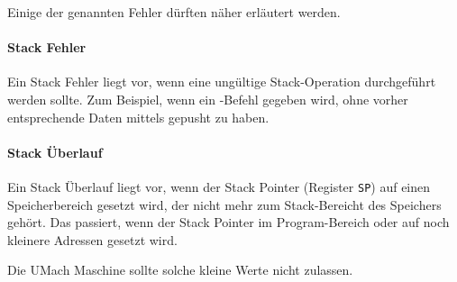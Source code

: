 Einige der genannten Fehler dürften näher erläutert werden.

\paragraph{Stack Fehler}
Ein Stack Fehler liegt vor, wenn eine ungültige Stack-Operation durchgeführt
werden sollte. Zum Beispiel, wenn ein -Befehl gegeben wird, ohne
vorher entsprechende Daten mittels  gepusht zu haben. 

\paragraph{Stack Überlauf}
Ein Stack Überlauf liegt vor, wenn der Stack Pointer (Register \texttt{SP}) auf
einen Speicherbereich gesetzt wird, der nicht mehr zum Stack-Bereicht des
Speichers gehört. Das passiert, wenn der Stack Pointer im Program-Bereich oder
auf noch kleinere Adressen gesetzt wird.

Die UMach Maschine sollte solche kleine Werte nicht zulassen.



